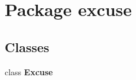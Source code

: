 \section{Package excuse}
\label{namespaceexcuse}


\subsection*{Classes}
\begin{CompactItemize}
\item 
class {\bf Excuse}
\end{CompactItemize}
